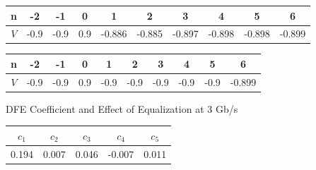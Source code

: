 \documentclass{book}  %
\begin{document}
\begin{paper}
\begin{figure}
	\begin{minipage}[tb]{\textwidth}
		\centering	
		\begin{tabular}{|c|c|c|c|c|c|c|c|c|c|}\hline
			n  &  -2  &  -1  &  0  &    1   &    2   &    3   &    4   &    5   &    6   \\ \hline 
			$V$ & -0.9 & -0.9 & 0.9 & -0.886 & -0.885 & -0.897 & -0.898 & -0.898 & -0.899 \\ \hline 
		\end{tabular}
		\label{table:3G_rxdiff_sample_wo_DFE}
	\end{minipage}	
	\begin{minipage}[tb]{\textwidth}
		\centering	
		\begin{tabular}{|c|c|c|c|c|c|c|c|c|c|}\hline
			n  &  -2  &  -1  &  0  &   1  &   2  &   3  &   4  &   5  &    6   \\ \hline 
			$V$ & -0.9 & -0.9 & 0.9 & -0.9 & -0.9 & -0.9 & -0.9 & -0.9 & -0.899 \\ \hline 
		\end{tabular}
		\label{table:3G_rxdiff_sample_w__DFE} 
	\end{minipage}
	\caption{DFE Coefficient and Effect of Equalization at 3 Gb/s}
\end{figure}

\begin{figure}
	\centering	
	\begin{minipage}[tb]{\textwidth}
		\centering	
		\begin{tabular}{|c|c|c|c|c|}\hline
			$c_{1}$ &  $c_{2}$ &  $c_{3}$ &  $c_{4}$ &  $c_{5}$ \\ \hline 
			0.194 &    0.007 &    0.046 &   -0.007 &    0.011 \\ \hline 
		\end{tabular}
		\label{table:20G_DFE_coeff} 
	\end{minipage}%
	

\end{figure}
\end{paper}
\end{document}
